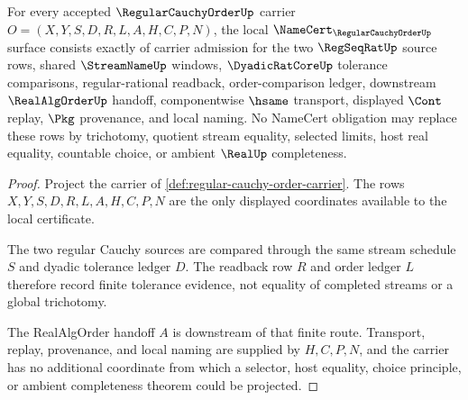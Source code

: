 \begin{theorem}
\label{thm:regular-cauchy-order-namecert-obligations}
For every accepted $\RegularCauchyOrderUp$ carrier $O=(X,Y,S,D,R,L,A,H,C,P,N)$, the local $\NameCert_{\RegularCauchyOrderUp}$ surface consists exactly of carrier admission for the two $\RegSeqRatUp$ source rows, shared $\StreamNameUp$ windows, $\DyadicRatCoreUp$ tolerance comparisons, regular-rational readback, order-comparison ledger, downstream $\RealAlgOrderUp$ handoff, componentwise $\hsame$ transport, displayed $\Cont$ replay, $\Pkg$ provenance, and local naming. No NameCert obligation may replace these rows by trichotomy, quotient stream equality, selected limits, host real equality, countable choice, or ambient $\RealUp$ completeness.
\end{theorem}
\begin{proof}
Project the carrier of \autoref{def:regular-cauchy-order-carrier}. The rows $X,Y,S,D,R,L,A,H,C,P,N$ are the only displayed coordinates available to the local certificate.

The two regular Cauchy sources are compared through the same stream schedule $S$ and dyadic tolerance ledger $D$. The readback row $R$ and order ledger $L$ therefore record finite tolerance evidence, not equality of completed streams or a global trichotomy.

The RealAlgOrder handoff $A$ is downstream of that finite route. Transport, replay, provenance, and local naming are supplied by $H,C,P,N$, and the carrier has no additional coordinate from which a selector, host equality, choice principle, or ambient completeness theorem could be projected.
\end{proof}

